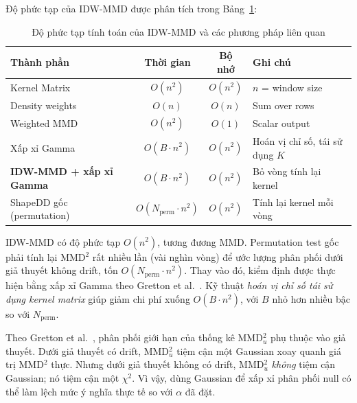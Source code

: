 Độ phức tạp của IDW-MMD được phân tích trong Bảng~\ref{tab:complexity}:

\begin{table}[H]
	\centering
	\caption{Độ phức tạp tính toán của IDW-MMD và các phương pháp liên quan}
	\label{tab:complexity}
	\begin{tabular}{|l|c|c|l|}
		\hline
		\textbf{Thành phần}     & \textbf{Thời gian}   & \textbf{Bộ nhớ} & \textbf{Ghi chú}    \\
		\hline
		Kernel Matrix           & $O(n^2)$             & $O(n^2)$        & $n$ = window size   \\
		Density weights         & $O(n)$               & $O(n)$          & Sum over rows       \\
		Weighted MMD            & $O(n^2)$             & $O(1)$          & Scalar output       \\
		Xấp xỉ Gamma            & $O(B \cdot n^2)$     & $O(n^2)$        & Hoán vị chỉ số, tái sử dụng $K$ \\
		\hline
		\textbf{IDW-MMD + xấp xỉ Gamma} & $O(B \cdot n^2)$ & $O(n^2)$        & Bỏ vòng tính lại kernel \\
		\hline
		ShapeDD gốc (permutation) & $O(N_{\text{perm}} \cdot n^2)$ & $O(n^2)$  & Tính lại kernel mỗi vòng \\
		\hline
	\end{tabular}
\end{table}

IDW-MMD có độ phức tạp $O(n^2)$, tương đương MMD. Permutation test gốc phải tính lại MMD$^2$ rất nhiều lần (vài nghìn vòng) để ước lượng phân phối dưới giả thuyết không drift, tốn $O(N_{\text{perm}} \cdot n^2)$. Thay vào đó, kiểm định được thực hiện bằng xấp xỉ Gamma theo Gretton et al.~\cite{gretton2009gamma}. Kỹ thuật \textit{hoán vị chỉ số tái sử dụng kernel matrix} giúp giảm chi phí xuống $O(B \cdot n^2)$, với $B$ nhỏ hơn nhiều bậc so với $N_{\text{perm}}$.
 
Theo Gretton et al.~\cite{gretton2012kernel}, phân phối giới hạn của thống kê MMD$^2_u$ phụ thuộc vào giả thuyết. Dưới giả thuyết có drift, MMD$^2_u$ tiệm cận một Gaussian xoay quanh giá trị MMD$^2$ thực. Nhưng dưới giả thuyết không có drift, MMD$^2_u$ \textit{không} tiệm cận Gaussian; nó tiệm cận một $\chi^2$. Vì vậy, dùng Gaussian để xấp xỉ phân phối null có thể làm lệch mức ý nghĩa thực tế so với $\alpha$ đã đặt.

